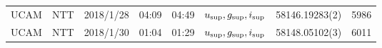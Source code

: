 \begin{table}
\begin{center}
\begin{tabular}{cccccccc}
			 UCAM & NTT & 2018/1/28  & 04:09 & 04:49 & $u_{\rm sup},g_{\rm sup},i_{\rm sup}$ & 58146.19283(2)                                                                                                            &                                        5986 \\
			 UCAM & NTT & 2018/1/30  & 01:04 & 01:29 & $u_{\rm sup},g_{\rm sup},i_{\rm sup}$ & 58148.05102(3)                                                                                                            &                                        6011 \\
			\hline
			\end{tabular}
	\end{center}
\end{table}
